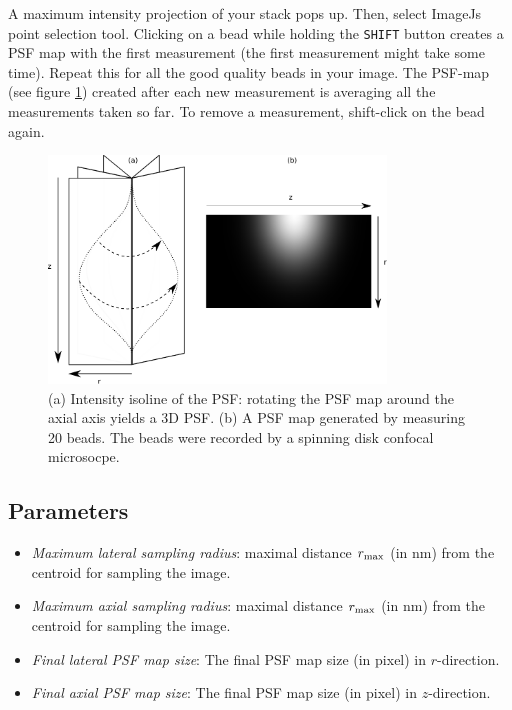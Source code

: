 \documentclass{scrartcl}
\begin{document}
A maximum intensity projection of your stack pops up. Then, select ImageJs point selection tool. Clicking on a bead while holding the \texttt{SHIFT} button creates a PSF map with the first measurement (the first measurement might take some time). Repeat this for all the good quality beads in your image. The PSF-map (see figure \ref{fig:psfmap}) created after each new measurement is averaging all the measurements taken so far. To remove a measurement, shift-click on the bead again.

\begin{figure}[h]
  \centering
  \includegraphics[width=0.8\textwidth]{psfmap} 
  \caption{ (a) Intensity isoline of the PSF: rotating the PSF map around the axial axis yields a 3D PSF. (b) A PSF map generated by measuring 20 beads. The beads were recorded by a spinning disk confocal microsocpe.
  \label{fig:psfmap}}
\end{figure}


\subsection{Parameters} 
\begin{itemize}
\item \textit{Maximum lateral sampling radius}: maximal distance $r_{\textnormal{max}}$ (in nm) from the centroid for sampling the image.
\item \textit{Maximum axial sampling radius}: maximal distance $r_{\textnormal{max}}$ (in nm) from the centroid for sampling the image.
\item \textit{Final lateral PSF map size}: The final PSF map size (in pixel) in $r$-direction.
\item \textit{Final axial PSF map size}: The final PSF map size (in pixel) in $z$-direction.
\end{itemize}
\end{document}
